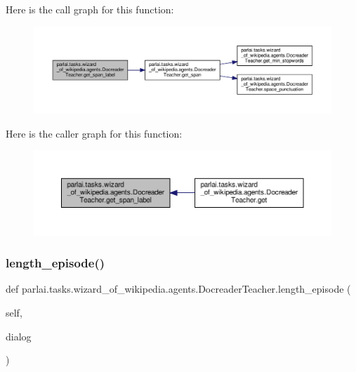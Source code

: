 Here is the call graph for this function\+:
\nopagebreak
\begin{figure}[H]
\begin{center}
\leavevmode
\includegraphics[width=350pt]{classparlai_1_1tasks_1_1wizard__of__wikipedia_1_1agents_1_1DocreaderTeacher_a0c5490abc01892bfdfe24f7efdfe97e4_cgraph}
\end{center}
\end{figure}
Here is the caller graph for this function\+:
\nopagebreak
\begin{figure}[H]
\begin{center}
\leavevmode
\includegraphics[width=350pt]{classparlai_1_1tasks_1_1wizard__of__wikipedia_1_1agents_1_1DocreaderTeacher_a0c5490abc01892bfdfe24f7efdfe97e4_icgraph}
\end{center}
\end{figure}
\mbox{\label{classparlai_1_1tasks_1_1wizard__of__wikipedia_1_1agents_1_1DocreaderTeacher_a1cb75f751dfa0b36d0f5c641c82be6c5}} 
\subsubsection{\texorpdfstring{length\+\_\+episode()}{length\_episode()}}
{\footnotesize\ttfamily def parlai.\+tasks.\+wizard\+\_\+of\+\_\+wikipedia.\+agents.\+Docreader\+Teacher.\+length\+\_\+episode (\begin{DoxyParamCaption}\item[{}]{self,  }\item[{}]{dialog }\end{DoxyParamCaption})}



